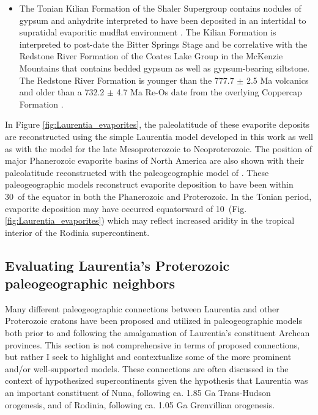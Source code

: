 \documentclass[twocolumn, switch]{article} %
\begin{document}
\begin{itemize}
\item The Tonian Kilian Formation of the Shaler Supergroup contains nodules of gypsum and anhydrite interpreted to have been deposited in an intertidal to supratidal evaporitic mudflat environment \citep{Prince2014a}. The Kilian Formation is interpreted to post-date the Bitter Springs Stage and be correlative with the Redstone River Formation of the Coates Lake Group in the McKenzie Mountains that contains bedded gypsum as well as gypsum-bearing siltstone\citep{Jefferson1989a, Jones2010a}. The Redstone River Formation is younger than the 777.7 $\pm$ 2.5 Ma volcanics and older than a 732.2 $\pm$ 4.7 Ma Re-Os date from the overlying Coppercap Formation \citep{Rooney2014a}.
\end{itemize}

In Figure \ref{fig:Laurentia_evaporites}, the paleolatitude of these evaporite deposits are reconstructed using the simple Laurentia model developed in this work as well as with the \cite{Li2013a} model for the late Mesoproterozoic to Neoproterozoic. The position of major Phanerozoic evaporite basins of North America are also shown with their paleolatitude reconstructed with the paleogeographic model of \cite{Torsvik2017a}. These paleogeographic models reconstruct evaporite deposition to have been within 30\textdegree\ of the equator in both the Phanerozoic and Proterozoic. In the Tonian period, evaporite deposition may have occurred equatorward of 10\textdegree\ (Fig. \ref{fig:Laurentia_evaporites}) which may reflect increased aridity in the tropical interior of the Rodinia supercontinent.

\subsection{Evaluating Laurentia's Proterozoic paleogeographic neighbors}

Many different paleogeographic connections between Laurentia and other Proterozoic cratons have been proposed and utilized in paleogeographic models both prior to and following the amalgamation of Laurentia's constituent Archean provinces. This section is not comprehensive in terms of proposed connections, but rather I seek to highlight and contextualize some of the more prominent and/or well-supported models. These connections are often discussed in the context of hypothesized supercontinents given the hypothesis that Laurentia was an important constituent of Nuna, following ca. 1.85 Ga Trans-Hudson orogenesis, and of Rodinia, following ca. 1.05 Ga Grenvillian orogenesis. 
\end{document}
